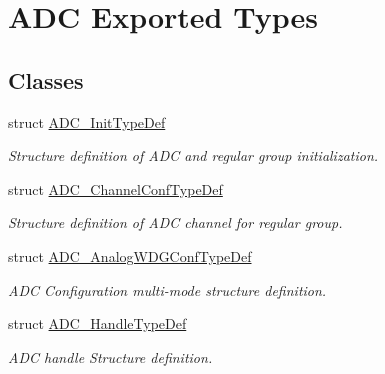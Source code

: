 \hypertarget{group___a_d_c___exported___types}{}\section{A\+DC Exported Types}
\label{group___a_d_c___exported___types}
\subsection*{Classes}
\begin{DoxyCompactItemize}
\item 
struct \mbox{\hyperlink{struct_a_d_c___init_type_def}{A\+D\+C\+\_\+\+Init\+Type\+Def}}
\begin{DoxyCompactList}\small\item\em Structure definition of A\+DC and regular group initialization. \end{DoxyCompactList}\item 
struct \mbox{\hyperlink{struct_a_d_c___channel_conf_type_def}{A\+D\+C\+\_\+\+Channel\+Conf\+Type\+Def}}
\begin{DoxyCompactList}\small\item\em Structure definition of A\+DC channel for regular group. \end{DoxyCompactList}\item 
struct \mbox{\hyperlink{struct_a_d_c___analog_w_d_g_conf_type_def}{A\+D\+C\+\_\+\+Analog\+W\+D\+G\+Conf\+Type\+Def}}
\begin{DoxyCompactList}\small\item\em A\+DC Configuration multi-\/mode structure definition. \end{DoxyCompactList}\item 
struct \mbox{\hyperlink{struct_a_d_c___handle_type_def}{A\+D\+C\+\_\+\+Handle\+Type\+Def}}
\begin{DoxyCompactList}\small\item\em A\+DC handle Structure definition. \end{DoxyCompactList}\end{DoxyCompactItemize}
